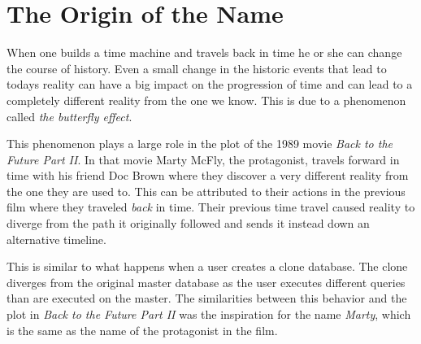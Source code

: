 \chapter{The Origin of the Name}
\label{ch:appendix-name}
When one builds a time machine and travels back in time he or she can change the course of history.
Even a small change in the historic events that lead to todays reality can have a big impact on the progression of time and can lead to a completely different reality from the one we know.
This is due to a phenomenon called \textit{the butterfly effect}.

This phenomenon plays a large role in the plot of the 1989 movie \textit{Back to the Future Part II}.
In that movie Marty McFly, the protagonist, travels forward in time with his friend Doc Brown where they discover a very different reality from the one they are used to.
This can be attributed to their actions in the previous film where they traveled \textit{back} in time.
Their previous time travel caused reality to diverge from the path it originally followed and sends it instead down an alternative timeline.

This is similar to what happens when a user creates a clone database.
The clone diverges from the original master database as the user executes different queries than are executed on the master.
The similarities between this behavior and the plot in \textit{Back to the Future Part II} was the inspiration for the name \textit{Marty}, which is the same as the name of the protagonist in the film.